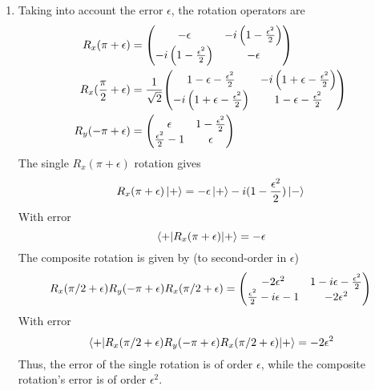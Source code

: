 \documentclass[12pt]{article}
\begin{document}
\begin{enumerate}[label=(\alph*)]
    \item Taking into account the error $\epsilon$, the rotation operators are
    \begin{align*}
        R_x(\pi + \epsilon) &= \mqty(-\epsilon & -i\left(1 - \frac{\epsilon^2}{2}\right) \\ -i\left(1 - \frac{\epsilon^2}{2}\right) & -\epsilon ) \\
        R_x(\frac{\pi}{2}+\epsilon) &= \frac{1}{\sqrt{2}}\mqty(1 - \epsilon - \frac{\epsilon^2}{2} & -i\left(1 + \epsilon - \frac{\epsilon^2}{2}\right) \\ -i\left(1 + \epsilon - \frac{\epsilon^2}{2}\right) & 1 - \epsilon - \frac{\epsilon^2}{2}) \\
        R_y(-\pi + \epsilon) &= \mqty(\epsilon & 1 - \frac{\epsilon^2}{2} \\ \frac{\epsilon^2}{2} -1 & \epsilon)
    \end{align*}
    The single $R_x(\pi + \epsilon)$ rotation gives
    \[ R_x(\pi + \epsilon)\ket{+} = -\epsilon\ket{+} - i(1-\frac{\epsilon^2}{2})\ket{-} \]
    With error
    \[ \mel{+}{R_x(\pi + \epsilon)}{+} = -\epsilon \]
    The composite rotation is given by (to second-order in $\epsilon$)
    \[ R_x(\pi/2 + \epsilon)R_y(-\pi + \epsilon)R_x(\pi/2 + \epsilon) = \mqty(-2\epsilon^2 & 1-i\epsilon-\frac{\epsilon^2}{2} \\ \frac{\epsilon^2}{2}-i\epsilon-1 & -2\epsilon^2) \]
    With error
    \[ \mel{+}{R_x(\pi/2 + \epsilon)R_y(-\pi + \epsilon)R_x(\pi/2 + \epsilon)}{+} = -2\epsilon^2 \]
    Thus, the error of the single rotation is of order $\epsilon$, while the composite rotation's error is of order $\epsilon^2$.
\end{enumerate}
\end{document}
